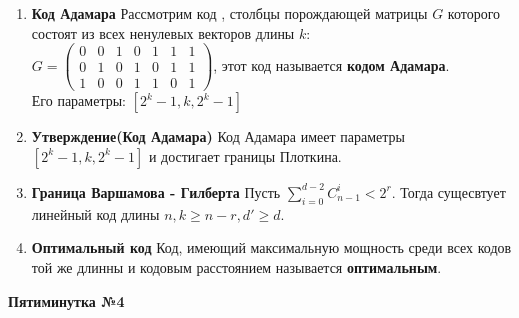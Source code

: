 \documentclass[a4paper, 12pt]{report}
\begin{document}
\begin{enumerate}
\item \textbf{Код Адамара}
Рассмотрим код , столбцы порождающей матрицы $G$ которого состоят из всех ненулевых векторов длины $k$:\\

$G = \begin{pmatrix}
0 & 0 & 1 & 0 & 1 & 1 & 1\\
0 & 1 & 0 & 1 & 0 & 1 & 1\\
1 & 0 & 0 & 1 & 1 & 0 & 1
\end{pmatrix}$, этот код называется \textbf{кодом Адамара}.\\

Его параметры: $[2^{k}-1, k, 2^{k}-1]$

\item \textbf{Утверждение(Код Адамара)}
Код Адамара имеет параметры $[2^{k}-1, k, 2^{k}-1]$ и достигает
границы Плоткина.

\item \textbf{Граница Варшамова - Гилберта}
Пусть $\sum_{i=0}^{d-2} C^{i}_{n-1} < 2^{r}$. Тогда сущесвтует линейный код длины $n, k\geq n-r, d' \geq d$.

\item \textbf{Оптимальный код} Код, имеющий максимальную мощность среди всех кодов той же длинны и кодовым расстоянием называется \textbf{оптимальным}.
\end{enumerate}


\textbf{Пятиминутка №4}
\end{document}
